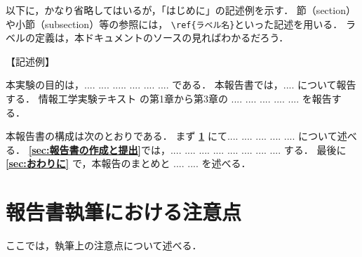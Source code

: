 \documentclass{ujarticle}[11pt]
\begin{document}
    以下に，かなり省略してはいるが，「{\gt はじめに}」の記述例を示す．
    節（section）や小節（subsection）等の参照には，
    \verb|\ref{ラベル名}|といった記述を用いる．
    ラベルの定義は，本ドキュメントのソースの見ればわかるだろう．
     
    \noindent
    【記述例】
     
    本実験の目的は，.... .... ..... .... .... .... である．
    本報告書では，.... について報告する．
    情報工学実験テキスト \cite{bib:実験テキスト} の第1章から第3章の
    .... .... .... .... .... を報告する．
     
    本報告書の構成は次のとおりである．
    まず 
    {\bf \ref{sec:報告書執筆における注意点}} にて.... .... .... .... .... 
    について述べる．
    {\bf \ref{sec:報告書の作成と提出}}では，.... .... .... .... .... .... 
    .... .... する．
    最後に {\bf \ref{sec:おわりに}} で，本報告のまとめと
    .... .... を述べる．
     
    \section{報告書執筆における注意点}
    \label{sec:報告書執筆における注意点}
     
    ここでは，執筆上の注意点について述べる．
     
\end{document}

